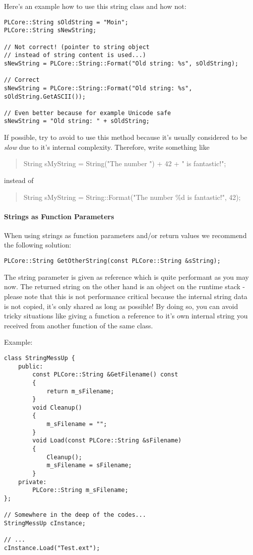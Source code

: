Here's an example how to use this string class and how not:

\begin{lstlisting}[caption=Valid and invalid string usage example]
PLCore::String sOldString = "Moin";
PLCore::String sNewString;

// Not correct! (pointer to string object
// instead of string content is used...)
sNewString = PLCore::String::Format("Old string: %s", sOldString);

// Correct
sNewString = PLCore::String::Format("Old string: %s", sOldString.GetASCII());

// Even better because for example Unicode safe
sNewString = "Old string: " + sOldString;
\end{lstlisting}

If possible, try to avoid to use this method because it's usually considered to be \emph{slow} due to it's internal complexity. Therefore, write something like
\begin{quote}String sMyString = String("The number ") + 42 + " is fantastic!";\end{quote} instead of \begin{quote}String sMyString = String::Format("The number \%d is fantastic!", 42);\end{quote}


\paragraph{Strings as Function Parameters}
When using strings as function parameters and/or return values we recommend the following solution:

\begin{lstlisting}[caption=String as function parameter and return value]
PLCore::String GetOtherString(const PLCore::String &sString);
\end{lstlisting}

The string parameter is given as reference which is quite performant as you may now. The returned string on the other hand is an object on the runtime stack - please note that this is not performance critical because the internal string data is not copied, it's only shared as long as possible! By doing so, you can avoid tricky situations like giving a function a reference to it's own internal string you received from another function of the same class.

Example:

\begin{lstlisting}[caption=Error prone string usage example]
class StringMessUp {
	public:
		const PLCore::String &GetFilename() const
		{
			return m_sFilename;
		}
		void Cleanup()
		{
			m_sFilename = "";
		}
		void Load(const PLCore::String &sFilename)
		{
			Cleanup();
			m_sFilename = sFilename;
		}
	private:
		PLCore::String m_sFilename;
};

// Somewhere in the deep of the codes...
StringMessUp cInstance;

// ...
cInstance.Load("Test.ext");
\end{lstlisting}


